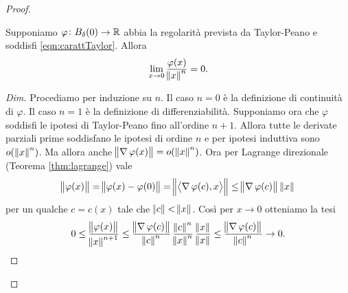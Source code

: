 \begin{proof}
	\begin{lemma}[Peano]
		Supponiamo $ \varphi \colon B_\delta(0) \to \mathbb{R} $ abbia la regolarità prevista da Taylor-Peano e soddisfi \eqref{eqn:carattTaylor}. Allora 
		\[
			\lim_{x \to 0} \frac{\varphi(x)}{\norm{x}^n} = 0.
		\]
	\end{lemma}
	\begin{proof}[Dim]
		Procediamo per induzione su $ n $. Il caso $ n = 0 $ è la definizione di continuità di $ \varphi $. Il caso $ n = 1 $ è la definizione di differenziabilità. Supponiamo ora che $ \varphi $ soddisfi le ipotesi di Taylor-Peano fino all'ordine $ n + 1 $. Allora tutte le derivate parziali prime soddisfano le ipotesi di ordine $ n $ e per ipotesi induttiva sono $ o(\,\norm{x}^n) $. Ma allora anche $ \norm{\operatorname{\nabla}{\varphi}(x)} = o(\,\norm{x}^n) $. Ora per Lagrange direzionale (Teorema \ref{thm:lagrange}) vale 
		\[
			\norm{\varphi(x)} = \norm{\varphi(x) - \varphi(0)} = \norm{\left\langle \operatorname{\nabla}{\varphi}(c), x \right\rangle} \leq \norm{\operatorname{\nabla}{\varphi}(c)} \, \norm{x}
		\]
		per un qualche $ c = c(x) $ tale che $ \norm{c} < \norm{x} $. Così per $ x \to 0 $ otteniamo la tesi
		\[
			0 \leq \frac{\norm{\varphi(x)}}{\norm{x}^{n + 1}} \leq \frac{\norm{\operatorname{\nabla}{\varphi}(c)}}{\norm{c}^n} \, \frac{\norm{c}^n}{\norm{x}^n} \, \frac{\norm{x}}{\norm{x}} \leq  \frac{\norm{\operatorname{\nabla}{\varphi}(c)}}{\norm{c}^n} \to 0. \qedhere
		\]
	\end{proof}


\end{proof}

